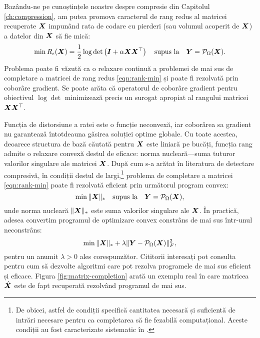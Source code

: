 \documentclass[../../book-main_ro.tex]{subfiles}
\begin{document}
Bazându-ne pe cunoștințele noastre despre compresie din Capitolul
\ref{ch:compression}, am putea promova caracterul de rang redus al
matricei recuperate $\bm{X}$ impunând rata de codare cu pierderi (sau
volumul acoperit de $\bm{X}$) a datelor din $\bm{X}$ să fie mică:
\begin{equation}
\min R_\epsilon(\bm{X}) = \frac{1}{2} \log \det \left(\boldsymbol{I} +
\alpha  \bm{X}\bm{X}^\top \right) \quad \mbox{supus la}
\quad
\bm{Y} = \mathcal{P}_{\Omega}(\bm{X}).
\label{eqn:rate-min}
\end{equation}
Problema poate fi văzută ca o relaxare continuă a problemei de mai sus
de completare a matricei de rang redus \eqref{eqn:rank-min} și poate fi
rezolvată prin coborâre gradient. Se poate arăta că operatorul de coborâre gradient
pentru obiectivul $\log\det$ minimizează precis un
surogat apropiat al rangului matricei $\bm{X}\bm{X}^\top$.

Funcția de distorsiune a ratei este o funcție neconvexă, iar coborârea sa
gradient nu garantează întotdeauna găsirea soluției optime globale. Cu toate acestea, deoarece structura de bază căutată pentru $\bm{X}$ este liniară pe bucăți, funcția rang admite o relaxare convexă destul de eficace: norma
nucleară---suma tuturor valorilor singulare ale matricei $\bm{X}$. După
cum s-a arătat în literatura de detectare compresivă, în condiții destul de
largi,\footnote{De obicei, astfel de condiții specifică
cantitatea necesară și suficientă de intrări necesare pentru ca completarea
să fie fezabilă computațional. Aceste condiții au fost
caracterizate sistematic în \cite{Wright-Ma-2022}.} problema de
completare a matricei \eqref{eqn:rank-min}
poate fi rezolvată eficient prin următorul program convex:
\begin{equation}
\min \|\bm{X}\|_* \quad \mbox{supus la}
\quad
\bm{Y} = \mathcal{P}_{\Omega}(\bm{X}),
\label{eqn:nuclear-min}
\end{equation}
unde norma nucleară $\|\bm{X}\|_*$ este suma valorilor singulare ale
$\bm{X}$. În practică, adesea convertim programul de optimizare convex constrâns de mai sus
într-unul neconstrâns:
\begin{equation}
\min \|\bm{X}\|_*  + \lambda \|
\bm{Y} - \mathcal{P}_{\Omega}(\bm{X})\|_F^2,
\label{eqn:nuclear-min-lagrangian}
\end{equation}
pentru un anumit $\lambda > 0$ ales corespunzător. Cititorii interesați pot consulta
\cite{Wright-Ma-2022} pentru cum să dezvolte algoritmi care pot rezolva
programele de mai sus eficient și eficace.
Figura \ref{fig:matrix-completion} arată un exemplu real în care
matricea $\hat {\bm{X}}$ este de fapt recuperată rezolvând programul de mai sus.
\end{document}
